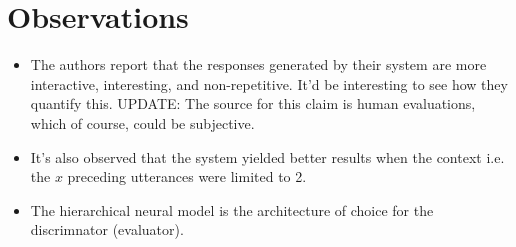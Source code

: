 \documentclass[12pt]{scrartcl}
\begin{document}
\section{Observations}
  \begin{itemize}
    \item The authors report that the responses generated by their system are more interactive, interesting, and
    non-repetitive. It'd be interesting to see how they quantify this. UPDATE: The source for this claim is human evaluations, which of course, could be subjective.
    \item It's also observed that the system yielded better results when the context i.e. the $x$ preceding utterances were limited to 2.
    \item The hierarchical neural model is the architecture of choice for the discrimnator (evaluator).
  \end{itemize}



\end{document}
